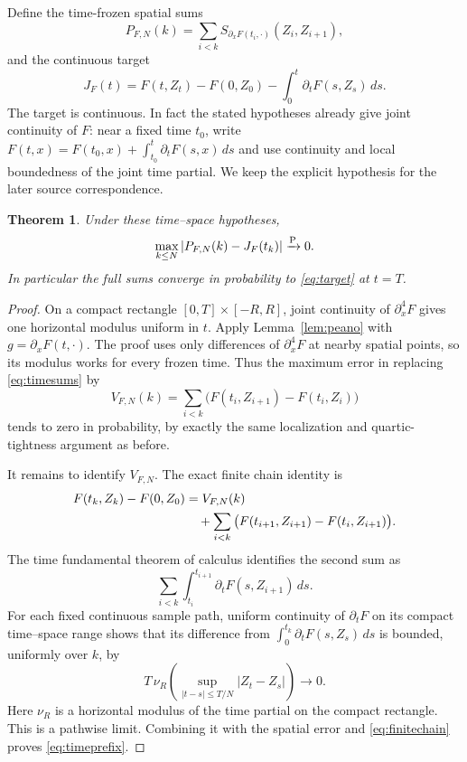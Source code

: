 \documentclass[11pt]{article}
\newtheorem{theorem}{Theorem}[section]
\theoremstyle{remark}\newtheorem{remark}[theorem]{Remark}
\begin{document}
Define the time-frozen spatial sums
\begin{equation}\label{eq:timesums}
 P_{F,N}(k)=\sum_{i<k}
 S_{\partial_xF(t_i,\cdot)}(Z_i,Z_{i+1}),
\end{equation}
and the continuous target
\begin{equation}\label{eq:target}
 J_F(t)=F(t,Z_t)-F(0,Z_0)
       -\int_0^t\partial_tF(s,Z_s)\,ds.
\end{equation}
The target is continuous. In fact the stated hypotheses already
give joint continuity of $F$: near a fixed time $t_0$, write
$F(t,x)=F(t_0,x)+\int_{t_0}^t\partial_tF(s,x)\,ds$ and use
continuity and local boundedness of the joint time partial.
We keep the explicit hypothesis for the later source correspondence.

\begin{theorem}\label{thm:time}
Under these time--space hypotheses,
\begin{equation}\label{eq:timeprefix}
 \max_{k\leq N}|P_{F,N}(k)-J_F(t_k)|\xrightarrow{\mathrm P}0.
\end{equation}
In particular the full sums converge in probability to
\eqref{eq:target} at $t=T$.
\end{theorem}
\begin{proof}
On a compact rectangle $[0,T]\times[-R,R]$, joint continuity
of $\partial_x^4F$ gives one horizontal modulus uniform in $t$.
Apply Lemma~\ref{lem:peano} with $g=\partial_xF(t,\cdot)$.
The proof uses only differences of $\partial_x^4F$ at nearby
spatial points, so its modulus works for every frozen time.
Thus the maximum error in replacing \eqref{eq:timesums} by
\[
 V_{F,N}(k)=\sum_{i<k}
     \big(F(t_i,Z_{i+1})-F(t_i,Z_i)\big)
\]
tends to zero in probability, by exactly the same localization
and quartic-tightness argument as before.

It remains to identify $V_{F,N}$. The exact finite chain identity is
\begin{align}\label{eq:finitechain}
 F(t_k,Z_k)-F(0,Z_0)
 &=V_{F,N}(k)\notag\\
 &\quad+\sum_{i<k}
       \big(F(t_{i+1},Z_{i+1})-F(t_i,Z_{i+1})\big).
\end{align}
The time fundamental theorem of calculus identifies the second
sum as
\[
 \sum_{i<k}\int_{t_i}^{t_{i+1}}\partial_tF(s,Z_{i+1})\,ds.
\]
For each fixed continuous sample path, uniform continuity of
$\partial_tF$ on its compact time--space range shows that its
difference from $\int_0^{t_k}\partial_tF(s,Z_s)\,ds$ is bounded,
uniformly over $k$, by
\[
 T\,\nu_R\!\left(\sup_{|t-s|\leq T/N}|Z_t-Z_s|\right)
 \longrightarrow0.
\]
Here $\nu_R$ is a horizontal modulus of the time partial on
the compact rectangle. This is a pathwise limit. Combining it
with the spatial error and \eqref{eq:finitechain} proves
\eqref{eq:timeprefix}.
\end{proof}
\end{document}
